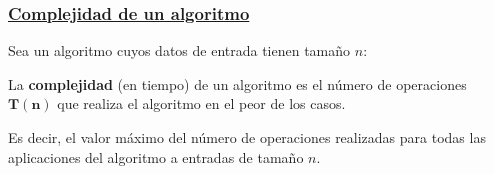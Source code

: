 \documentclass[twoside]{report}
\newcommand{\bs}[1]{\boldsymbol{#1}}
\begin{document}
%
%
%
%
%



\subsubsection{\underline{Complejidad de un algoritmo}}

Sea un algoritmo cuyos datos de entrada tienen tama\~{n}o $n$:
\vspace{0.4cm}

\begin{defi}
La \textbf{complejidad} (en tiempo) de un algoritmo es el n\'{u}\-me\-ro de operaciones $\bs{T(n)}$ que realiza el algoritmo en el peor de los casos.


\vspace{0.2cm}

Es decir, el valor m\'{a}ximo del n\'{u}mero de operaciones realizadas para todas las aplicaciones del algoritmo a entradas de tama\~{n}o $n.$
\end{defi}
\end{document}
